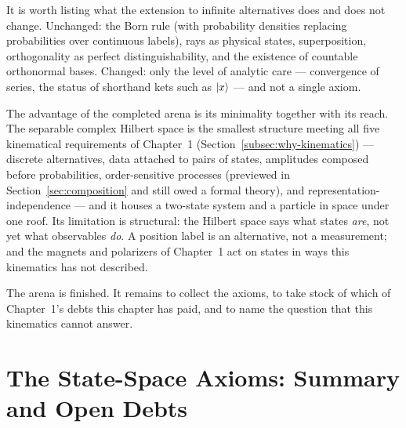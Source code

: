 It is worth listing what the extension to infinite alternatives does and does not change. Unchanged: the Born rule (with probability densities replacing probabilities over continuous labels), rays as physical states, superposition, orthogonality as perfect distinguishability, and the existence of countable orthonormal bases. Changed: only the level of analytic care --- convergence of series, the status of shorthand kets such as $\ket{x}$ --- and not a single axiom.

The advantage of the completed arena is its minimality together with its reach. The separable complex Hilbert space is the smallest structure meeting all five kinematical requirements of Chapter~1 (Section~\ref{subsec:why-kinematics}) --- discrete alternatives, data attached to pairs of states, amplitudes composed before probabilities, order-sensitive processes (previewed in Section~\ref{sec:composition} and still owed a formal theory), and representation-independence --- and it houses a two-state system and a particle in space under one roof. Its limitation is structural: the Hilbert space says what states \emph{are}, not yet what observables \emph{do}. A position label is an alternative, not a measurement; and the magnets and polarizers of Chapter~1 act on states in ways this kinematics has not described.

The arena is finished. It remains to collect the axioms, to take stock of which of Chapter~1's debts this chapter has paid, and to name the question that this kinematics cannot answer.

\section{The State-Space Axioms: Summary and Open Debts}
\label{sec:ch2summary}

